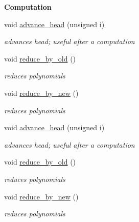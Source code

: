 \begin{Indent}\textbf{ Computation}\par
\begin{DoxyCompactItemize}
\item 
\mbox{\label{group___g_b_computation_a1ada1a83d58ab22e7115b3c90a5d7f3f}} 
void \hyperlink{group___g_b_computation_a1ada1a83d58ab22e7115b3c90a5d7f3f}{advance\+\_\+head} (unsigned i)
\begin{DoxyCompactList}\small\item\em advances {\ttfamily head}; useful after a computation \end{DoxyCompactList}\item 
\mbox{\label{group___g_b_computation_a841c43903004e8a8e355bfcf30dfd36c}} 
void \hyperlink{group___g_b_computation_a841c43903004e8a8e355bfcf30dfd36c}{reduce\+\_\+by\+\_\+old} ()
\begin{DoxyCompactList}\small\item\em reduces polynomials \end{DoxyCompactList}\item 
\mbox{\label{group___g_b_computation_a395928a83fb46aba60804c3d2b80c84a}} 
void \hyperlink{group___g_b_computation_a395928a83fb46aba60804c3d2b80c84a}{reduce\+\_\+by\+\_\+new} ()
\begin{DoxyCompactList}\small\item\em reduces polynomials \end{DoxyCompactList}\item 
\mbox{\label{group___g_b_computation_a1ada1a83d58ab22e7115b3c90a5d7f3f}} 
void \hyperlink{group___g_b_computation_a1ada1a83d58ab22e7115b3c90a5d7f3f}{advance\+\_\+head} (unsigned i)
\begin{DoxyCompactList}\small\item\em advances {\ttfamily head}; useful after a computation \end{DoxyCompactList}\item 
\mbox{\label{group___g_b_computation_a841c43903004e8a8e355bfcf30dfd36c}} 
void \hyperlink{group___g_b_computation_a841c43903004e8a8e355bfcf30dfd36c}{reduce\+\_\+by\+\_\+old} ()
\begin{DoxyCompactList}\small\item\em reduces polynomials \end{DoxyCompactList}\item 
\mbox{\label{group___g_b_computation_a395928a83fb46aba60804c3d2b80c84a}} 
void \hyperlink{group___g_b_computation_a395928a83fb46aba60804c3d2b80c84a}{reduce\+\_\+by\+\_\+new} ()
\begin{DoxyCompactList}\small\item\em reduces polynomials \end{DoxyCompactList}\end{DoxyCompactItemize}
\end{Indent}
